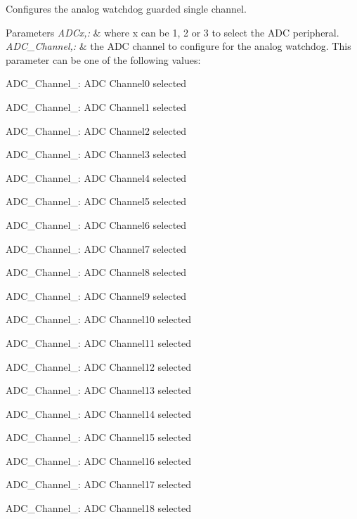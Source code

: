 Configures the analog watchdog guarded single channel. 


\begin{DoxyParams}{Parameters}
{\em A\-D\-Cx,\-:} & where x can be 1, 2 or 3 to select the A\-D\-C peripheral. \\
\hline
{\em A\-D\-C\-\_\-\-Channel,\-:} & the A\-D\-C channel to configure for the analog watchdog. This parameter can be one of the following values\-: \begin{DoxyItemize}
\item A\-D\-C\-\_\-\-Channel\-\_\-: A\-D\-C Channel0 selected \item A\-D\-C\-\_\-\-Channel\-\_\-: A\-D\-C Channel1 selected \item A\-D\-C\-\_\-\-Channel\-\_\-: A\-D\-C Channel2 selected \item A\-D\-C\-\_\-\-Channel\-\_\-: A\-D\-C Channel3 selected \item A\-D\-C\-\_\-\-Channel\-\_\-: A\-D\-C Channel4 selected \item A\-D\-C\-\_\-\-Channel\-\_\-: A\-D\-C Channel5 selected \item A\-D\-C\-\_\-\-Channel\-\_\-: A\-D\-C Channel6 selected \item A\-D\-C\-\_\-\-Channel\-\_\-: A\-D\-C Channel7 selected \item A\-D\-C\-\_\-\-Channel\-\_\-: A\-D\-C Channel8 selected \item A\-D\-C\-\_\-\-Channel\-\_\-: A\-D\-C Channel9 selected \item A\-D\-C\-\_\-\-Channel\-\_\-: A\-D\-C Channel10 selected \item A\-D\-C\-\_\-\-Channel\-\_\-: A\-D\-C Channel11 selected \item A\-D\-C\-\_\-\-Channel\-\_\-: A\-D\-C Channel12 selected \item A\-D\-C\-\_\-\-Channel\-\_\-: A\-D\-C Channel13 selected \item A\-D\-C\-\_\-\-Channel\-\_\-: A\-D\-C Channel14 selected \item A\-D\-C\-\_\-\-Channel\-\_\-: A\-D\-C Channel15 selected \item A\-D\-C\-\_\-\-Channel\-\_\-: A\-D\-C Channel16 selected \item A\-D\-C\-\_\-\-Channel\-\_\-: A\-D\-C Channel17 selected \item A\-D\-C\-\_\-\-Channel\-\_\-: A\-D\-C Channel18 selected \end{DoxyItemize}
\\
\hline
\end{DoxyParams}

